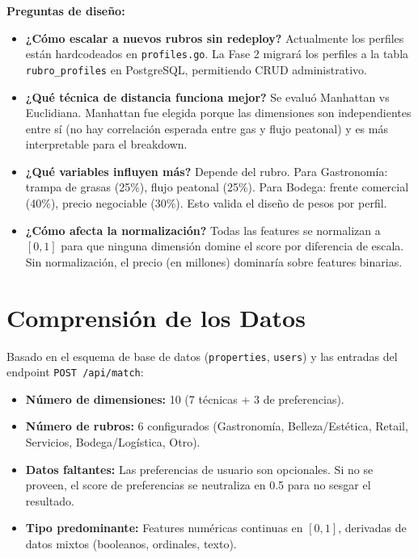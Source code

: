 \documentclass[11pt,a4paper]{article}
\begin{document}
\textbf{Preguntas de diseño:}
\begin{itemize}
    \item \textbf{¿Cómo escalar a nuevos rubros sin redeploy?} Actualmente los perfiles están hardcodeados en \texttt{profiles.go}. La Fase 2 migrará los perfiles a la tabla \texttt{rubro\_profiles} en PostgreSQL, permitiendo CRUD administrativo.
    \item \textbf{¿Qué técnica de distancia funciona mejor?} Se evaluó Manhattan vs Euclidiana. Manhattan fue elegida porque las dimensiones son independientes entre sí (no hay correlación esperada entre gas y flujo peatonal) y es más interpretable para el breakdown.
    \item \textbf{¿Qué variables influyen más?} Depende del rubro. Para Gastronomía: trampa de grasas (25\%), flujo peatonal (25\%). Para Bodega: frente comercial (40\%), precio negociable (30\%). Esto valida el diseño de pesos por perfil.
    \item \textbf{¿Cómo afecta la normalización?} Todas las features se normalizan a $[0,1]$ para que ninguna dimensión domine el score por diferencia de escala. Sin normalización, el precio (en millones) dominaría sobre features binarias.
\end{itemize}

\section{Comprensión de los Datos}
Basado en el esquema de base de datos (\texttt{properties}, \texttt{users}) y las entradas del endpoint \texttt{POST /api/match}:
\begin{itemize}
    \item \textbf{Número de dimensiones:} 10 (7 técnicas + 3 de preferencias).
    \item \textbf{Número de rubros:} 6 configurados (Gastronomía, Belleza/Estética, Retail, Servicios, Bodega/Logística, Otro).
    \item \textbf{Datos faltantes:} Las preferencias de usuario son opcionales. Si no se proveen, el score de preferencias se neutraliza en 0.5 para no sesgar el resultado.
    \item \textbf{Tipo predominante:} Features numéricas continuas en $[0,1]$, derivadas de datos mixtos (booleanos, ordinales, texto).
\end{itemize}
\end{document}
